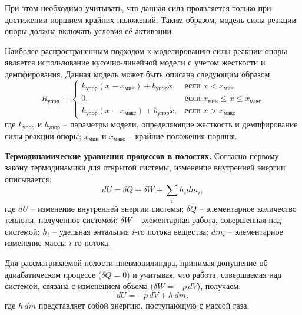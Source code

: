 При этом необходимо учитывать, что данная сила проявляется только при достижении
поршнем крайних положений. Таким образом, модель силы реакции опоры должна включать
условия её активации.

Наиболее распространенным подходом к моделированию силы реакции опоры является использование кусочно-линейной модели с
учетом жесткости и демпфирования. Данная модель может быть описана следующим образом:
\begin{equation}
	\label{eq:ch2/support_reaction}
	R_\text{упор} = \begin{cases}
		k_\text{упор}(x - x_\text{мин}) + b_\text{упор}\dot{x},  & \text{если } x < x_\text{мин}                       \\
		0,                                                       & \text{если } x_\text{мин} \leq x \leq x_\text{макс} \\
		k_\text{упор}(x - x_\text{макс}) + b_\text{упор}\dot{x}, & \text{если } x > x_\text{макс}
	\end{cases}
\end{equation}
где $k_\text{упор}$ и $b_\text{упор}$ -- параметры модели, определяющие жесткость и демпфирование силы реакции опоры;
$x_\text{мин}$ и $x_\text{макс}$ -- крайние положения поршня.


\textbf{Термодинамические уравнения процессов в полостях.}
Согласно первому закону термодинамики для открытой системы,
изменение внутренней энергии описывается:
\begin{equation}
	\label{eq:ch2/first_law}
	dU = \delta Q + \delta W + \sum_i h_i dm_i,
\end{equation}
где $dU$ -- изменение внутренней энергии системы;
$\delta Q$ -- элементарное количество теплоты, полученное системой;
$\delta W$ -- элементарная работа, совершенная над системой;
$h_i$ -- удельная энтальпия $i$-го потока вещества;
$dm_i$ -- элементарное изменение массы $i$-го потока.

Для рассматриваемой полости пневмоцилиндра, принимая допущение об
адиабатическом процессе ($\delta Q = 0$) и учитывая, что работа,
совершаемая над системой, связана с изменением объема ($\delta W = -p\,dV$), получаем:
\begin{equation}
	\label{eq:ch2/internal_energy_change}
	dU = -p\,dV + h\,dm,
\end{equation}
где $h\,dm$ представляет собой энергию, поступающую с массой газа.

